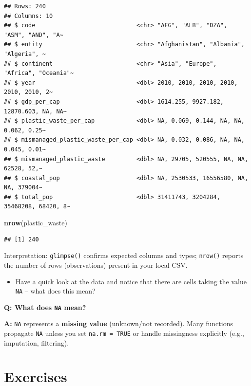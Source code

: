 \documentclass[
]{article}
\newenvironment{Shaded}{\begin{snugshade}}{\end{snugshade}}
\newcommand{\FunctionTok}[1]{\textcolor[rgb]{0.13,0.29,0.53}{\textbf{#1}}}
\newcommand{\NormalTok}[1]{#1}
\providecommand{\tightlist}{%
  \setlength{\itemsep}{0pt}\setlength{\parskip}{0pt}}
\begin{document}
\begin{verbatim}
## Rows: 240
## Columns: 10
## $ code                             <chr> "AFG", "ALB", "DZA", "ASM", "AND", "A~
## $ entity                           <chr> "Afghanistan", "Albania", "Algeria", ~
## $ continent                        <chr> "Asia", "Europe", "Africa", "Oceania"~
## $ year                             <dbl> 2010, 2010, 2010, 2010, 2010, 2010, 2~
## $ gdp_per_cap                      <dbl> 1614.255, 9927.182, 12870.603, NA, NA~
## $ plastic_waste_per_cap            <dbl> NA, 0.069, 0.144, NA, NA, 0.062, 0.25~
## $ mismanaged_plastic_waste_per_cap <dbl> NA, 0.032, 0.086, NA, NA, 0.045, 0.01~
## $ mismanaged_plastic_waste         <dbl> NA, 29705, 520555, NA, NA, 62528, 52,~
## $ coastal_pop                      <dbl> NA, 2530533, 16556580, NA, NA, 379004~
## $ total_pop                        <dbl> 31411743, 3204284, 35468208, 68420, 8~
\end{verbatim}

\begin{Shaded}
\begin{Highlighting}[]
\FunctionTok{nrow}\NormalTok{(plastic\_waste)}
\end{Highlighting}
\end{Shaded}

\begin{verbatim}
## [1] 240
\end{verbatim}

Interpretation: \texttt{glimpse()} confirms expected columns and types;
\texttt{nrow()} reports the number of rows (observations) present in
your local CSV.

\begin{itemize}
\tightlist
\item
  Have a quick look at the data and notice that there are cells taking
  the value \texttt{NA} -- what does this mean?
\end{itemize}

\textbf{Q: What does \texttt{NA} mean?}

\textbf{A:} \texttt{NA} represents a \textbf{missing value} (unknown/not
recorded). Many functions propagate \texttt{NA} unless you set
\texttt{na.rm\ =\ TRUE} or handle missingness explicitly (e.g.,
imputation, filtering).

\section{Exercises}\label{exercises}
\end{document}
